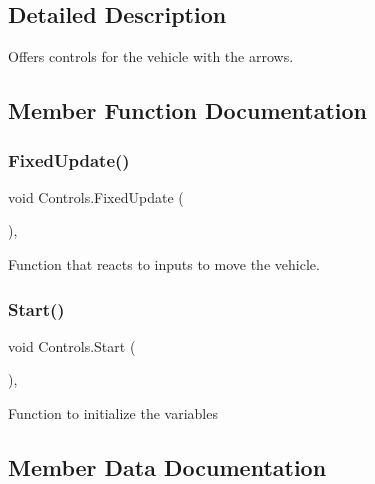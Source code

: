 \subsection{Detailed Description}
Offers controls for the vehicle with the arrows. 



\subsection{Member Function Documentation}
\mbox{\label{classControls_a0ed8795b9204c879238f5acffaacfa0c}} 
\subsubsection{\texorpdfstring{Fixed\+Update()}{FixedUpdate()}}
{\footnotesize\ttfamily void Controls.\+Fixed\+Update (\begin{DoxyParamCaption}{ }\end{DoxyParamCaption})\hspace{0.3cm}{\ttfamily [inline]}, {\ttfamily [private]}}



Function that reacts to inputs to move the vehicle. 

\mbox{\label{classControls_a649999d032808915ff6eb765abbc00ea}} 
\subsubsection{\texorpdfstring{Start()}{Start()}}
{\footnotesize\ttfamily void Controls.\+Start (\begin{DoxyParamCaption}{ }\end{DoxyParamCaption})\hspace{0.3cm}{\ttfamily [inline]}, {\ttfamily [private]}}



Function to initialize the variables 



\subsection{Member Data Documentation}
\mbox{\label{classControls_a723b624e75a9d0fdbb9f37f30fc6a4b4}} 
